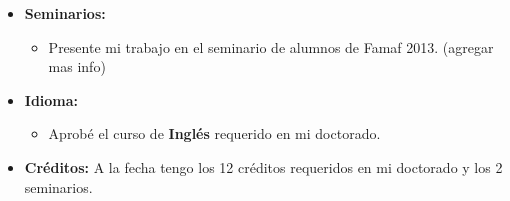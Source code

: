 \begin{itemize}
\item \textbf{Seminarios:}
\begin{itemize}
\item Presente mi trabajo en el seminario de alumnos de Famaf 2013. (agregar mas info)
\end{itemize}
\item \textbf{Idioma:}
\begin{itemize}
\item Aprob\'e el curso de \textbf{Ingl\'es} requerido en mi doctorado.


\end{itemize}

\item  \textbf{Cr\'editos:} 
A la fecha tengo los 12 cr\'editos requeridos en mi doctorado y los 2 seminarios.


\end{itemize}




